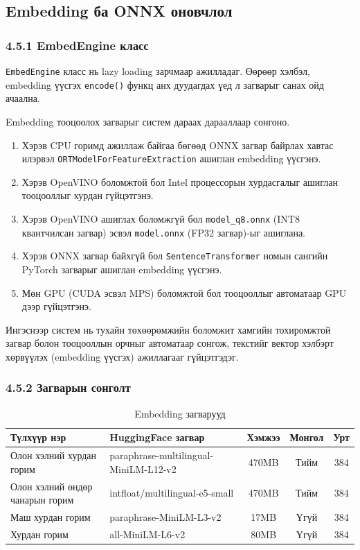 \documentclass[11pt,a4paper]{article}
\begin{document}
\subsection{Embedding ба ONNX оновчлол}

\subsubsection*{4.5.1 EmbedEngine класс}

\texttt{EmbedEngine} класс нь lazy loading зарчмаар ажилладаг. Өөрөөр хэлбэл, embedding үүсгэх \texttt{encode()} функц анх дуудагдах үед л загварыг санах ойд ачаална.

Embedding тооцоолох загварыг систем дараах дарааллаар сонгоно.

\begin{enumerate}
\item Хэрэв CPU горимд ажиллаж байгаа бөгөөд ONNX загвар байрлах хавтас илэрвэл \texttt{ORTModelForFeatureExtraction} ашиглан embedding үүсгэнэ.
\item Хэрэв OpenVINO боломжтой бол Intel процессорын хурдасгалыг ашиглан тооцооллыг хурдан гүйцэтгэнэ.
\item Хэрэв OpenVINO ашиглах боломжгүй бол \texttt{model\_q8.onnx} (INT8 квантчилсан загвар) эсвэл \texttt{model.onnx} (FP32 загвар)-ыг ашиглана.
\item Хэрэв ONNX загвар байхгүй бол \texttt{SentenceTransformer} номын сангийн PyTorch загварыг ашиглан embedding үүсгэнэ.
\item Мөн GPU (CUDA эсвэл MPS) боломжтой бол тооцооллыг автоматаар GPU дээр гүйцэтгэнэ.
\end{enumerate}

Ингэснээр систем нь тухайн төхөөрөмжийн боломжит хамгийн тохиромжтой загвар болон тооцооллын орчныг автоматаар сонгож, текстийг вектор хэлбэрт хөрвүүлэх (embedding үүсгэх) ажиллагааг гүйцэтгэдэг.
\subsubsection*{4.5.2 Загварын сонголт}

\begin{table}[H]
\centering
\caption{Embedding загварууд}
\label{tab:embed_models}
\small
\begin{tabularx}{\textwidth}{|>{\raggedright\arraybackslash}X|>{\raggedright\arraybackslash}X|c|c|c|}
\hline
\textbf{Түлхүүр нэр} & \textbf{HuggingFace загвар} & \textbf{Хэмжээ} & \textbf{Монгол} & \textbf{Урт} \\
\hline
Олон хэлний хурдан горим       & paraphrase-multilingual-MiniLM-L12-v2 & 470MB & Тийм & 384 \\
Олон хэлний өндөр чанарын горим & intfloat/multilingual-e5-small        & 470MB & Тийм & 384 \\
Маш хурдан горим               & paraphrase-MiniLM-L3-v2               & 17MB  & Үгүй & 384 \\
Хурдан горим                   & all-MiniLM-L6-v2                      & 80MB  & Үгүй & 384 \\
\hline
\end{tabularx}
\end{table}
\end{document}

